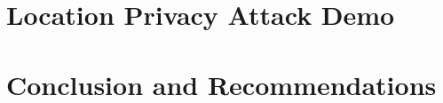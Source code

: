 \documentclass[12pt]{report}
\theoremstyle{named}
\begin{document}
\chapter{Location Privacy Attack Demo }


\chapter{Conclusion and Recommendations}




\end{document}
